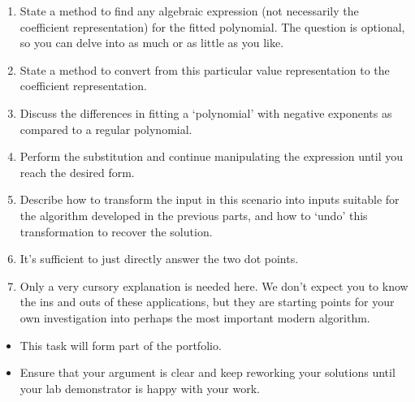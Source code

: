 \documentclass{article}
\begin{document}
\begin{rubric}
\begin{enumerate}[label=(\alph*)]
    \item State a method to find any algebraic expression (not necessarily the coefficient representation) for the fitted polynomial. The question is optional, so you can delve into as much or as little as you like.
    \item State a method to convert from this particular value representation to the coefficient representation.
    \item Discuss the differences in fitting a `polynomial' with negative exponents as compared to a regular polynomial.
    \item Perform the substitution and continue manipulating the expression until you reach the desired form.
    \item Describe how to transform the input in this scenario into inputs suitable for the algorithm developed in the previous parts, and how to `undo' this transformation to recover the solution.
    \item It's sufficient to just directly answer the two dot points.
    \item Only a very cursory explanation is needed here. We don't expect you to know the ins and outs of these applications, but they are starting points for your own investigation into perhaps the most important modern algorithm.
\end{enumerate}
\begin{itemize}
    \item This task will form part of the portfolio.
    \item Ensure that your argument is clear and keep reworking your solutions until your lab demonstrator is happy with your work.
\end{itemize}
\end{rubric}
\end{document}
